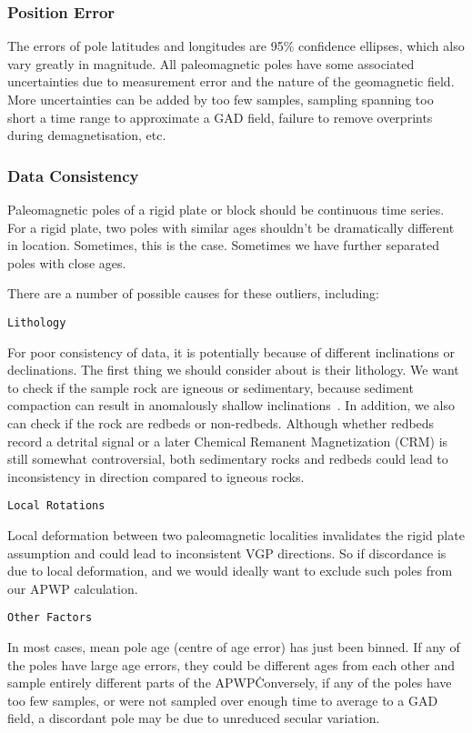 \subsubsection{Position Error}

The errors of pole latitudes and longitudes are 95\% confidence ellipses,
which also vary greatly in magnitude. All paleomagnetic poles have some
associated uncertainties due to measurement error and the nature of the
geomagnetic field. More uncertainties can be added by too few samples,
sampling spanning too short a time range to approximate a GAD field, failure
to remove overprints during demagnetisation, etc.

\subsubsection{Data Consistency}

Paleomagnetic poles of a rigid plate or block should be continuous time series.
For a rigid plate, two poles with similar ages shouldn't be dramatically
different in location. Sometimes, this is the case. Sometimes we have further
separated poles with close ages.

There are a number of possible causes for these outliers, including:

\verb"Lithology"

For poor consistency of data, it is potentially because of different
inclinations or declinations. The first thing we should consider about is
their lithology. We want to check if the sample rock are igneous or
sedimentary, because sediment compaction can result in anomalously shallow
inclinations~\citep{T17}. In addition, we also can check if the rock are
redbeds or non-redbeds. Although whether redbeds record a detrital signal or a
later Chemical Remanent Magnetization (CRM) is still somewhat controversial,
both sedimentary rocks and redbeds could lead to inconsistency in direction
compared to igneous rocks.

\verb"Local Rotations"

Local deformation between two paleomagnetic localities invalidates the rigid
plate assumption and could lead to inconsistent VGP directions. So if
discordance is due to local deformation, and we would ideally want to exclude
such poles from our APWP calculation.

\verb"Other Factors"

In most cases, mean pole age (centre of age error) has just been binned. If
any of the poles have large age errors, they could be different ages from each
other and sample entirely different parts of the APWP\. Conversely, if any of
the poles have too few samples, or were not sampled over enough time to average
to a GAD field, a discordant pole may be due to unreduced secular variation.


